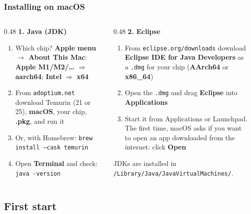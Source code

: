 \documentclass[aspectratio=169,10pt,compress]{beamer}
\newcommand{\cmd}[1]{\texttt{\color{gitred}#1}}
\newcommand{\menu}[1]{\textsf{\textbf{#1}}}                      %
\begin{document}
\begin{frame}[t,fragile] \frametitle{Installing on macOS}
  \begin{columns}[T]
    \begin{column}{0.48\textwidth}
      \textbf{1. Java (JDK)}
      \begin{enumerate}\small
        \item Which chip? \menu{Apple menu $\rightarrow$ About This Mac}:
              \textbf{Apple M1/M2/\dots} $\Rightarrow$ \textbf{aarch64}; \textbf{Intel} $\Rightarrow$ \textbf{x64}
        \item From \texttt{adoptium.net} download Temurin (21 or 25), \textbf{macOS}, your chip, \textbf{.pkg}, and run it
        \item Or, with Homebrew: \cmd{brew install --cask temurin}
        \item Open \textbf{Terminal} and check: \cmd{java -version}
      \end{enumerate}
    \end{column}
    \begin{column}{0.48\textwidth}
      \textbf{2. Eclipse}
      \begin{enumerate}\small
        \item From \texttt{eclipse.org/downloads} download \textbf{Eclipse IDE for Java Developers}
              as a \texttt{.dmg} for your chip (\textbf{AArch64} or \textbf{x86\_64})
        \item Open the \texttt{.dmg} and drag \textbf{Eclipse} into \textbf{Applications}
        \item Start it from Applications or Launchpad. The first time, macOS asks if you
              want to open an app downloaded from the internet: click \menu{Open}
      \end{enumerate}
      \small JDKs are installed in \texttt{/Library/Java/JavaVirtualMachines/}.
    \end{column}
  \end{columns}
\end{frame}

\subsection[Start]{First start}
\end{document}
